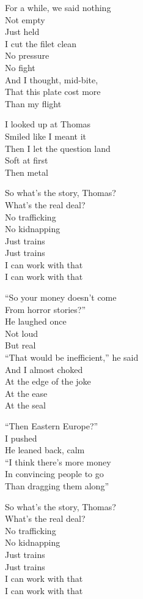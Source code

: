\begin{lyrics}
For a while, we said nothing\\
Not empty\\
Just held\\
I cut the filet clean\\
No pressure\\
No fight\\
And I thought, mid-bite,\\
That this plate cost more\\
Than my flight

I looked up at Thomas\\
Smiled like I meant it\\
Then I let the question land\\
Soft at first\\
Then metal

So what’s the story, Thomas?\\
What’s the real deal?\\
No trafficking\\
No kidnapping\\
Just trains\\
Just trains\\
I can work with that\\
I can work with that

“So your money doesn’t come\\
From horror stories?”\\
He laughed once\\
Not loud\\
But real\\
“That would be inefficient,” he said\\
And I almost choked\\
At the edge of the joke\\
At the ease\\
At the seal

“Then Eastern Europe?”\\
I pushed\\
He leaned back, calm\\
“I think there’s more money\\
In convincing people to go\\
Than dragging them along”

So what’s the story, Thomas?\\
What’s the real deal?\\
No trafficking\\
No kidnapping\\
Just trains\\
Just trains\\
I can work with that\\
I can work with that


\end{lyrics}
